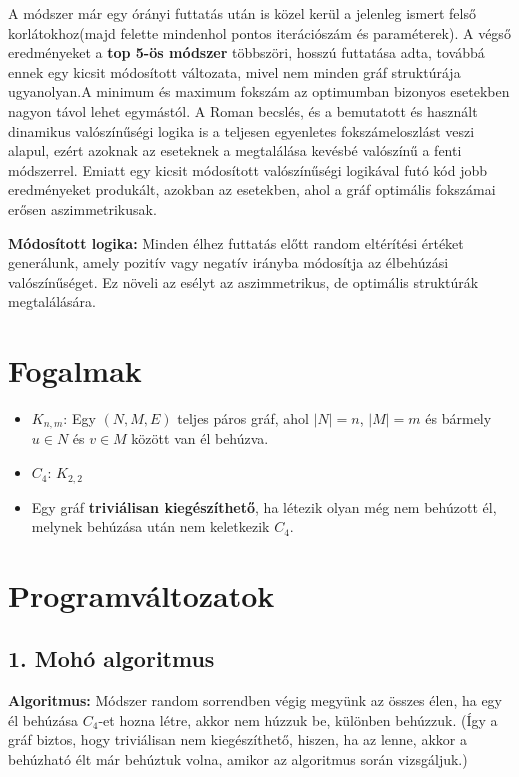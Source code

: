 \documentclass[12pt,a4paper]{article}
\begin{document}
A módszer már egy órányi futtatás után is közel kerül a jelenleg ismert felső korlátokhoz(majd felette mindenhol pontos iterációszám és paraméterek). A végső eredményeket a \textbf{top 5-ös módszer} többszöri, hosszú futtatása adta, továbbá ennek egy kicsit módosított változata, mivel nem minden gráf struktúrája ugyanolyan.A minimum és maximum fokszám az optimumban bizonyos esetekben nagyon távol lehet egymástól. A Roman becslés, és a bemutatott és használt dinamikus valószínűségi logika is a teljesen egyenletes fokszámeloszlást veszi alapul, ezért azoknak az eseteknek a megtalálása kevésbé valószínű a fenti módszerrel.
Emiatt egy kicsit módosított valószínűségi logikával futó kód jobb eredményeket produkált, azokban az esetekben, ahol a gráf optimális fokszámai erősen aszimmetrikusak.

\textbf{Módosított logika:} Minden élhez futtatás előtt random eltérítési értéket generálunk, amely pozitív vagy negatív irányba módosítja az élbehúzási valószínűséget. Ez növeli az esélyt az aszimmetrikus, de optimális struktúrák megtalálására.

\section*{Fogalmak}

\begin{itemize}
    \item $K_{n,m}$: Egy $(N,M,E)$ teljes páros gráf, ahol $|N|=n$, $|M|=m$ és bármely $u \in N$ és $v \in M$ között van él behúzva.
    \item $C_4$: $K_{2,2}$
    \item Egy gráf \textbf{triviálisan kiegészíthető}, ha létezik olyan még nem behúzott él, melynek behúzása után nem keletkezik $C_4$.
\end{itemize}

\section*{Programváltozatok}

\subsection*{1. Mohó algoritmus}
\textbf{Algoritmus:} Módszer random sorrendben végig megyünk az összes élen, ha egy él behúzása $C_4$-et hozna létre, akkor nem húzzuk be, különben behúzzuk. (Így a gráf biztos, hogy triviálisan nem kiegészíthető, hiszen, ha az lenne, akkor a behúzható élt már behúztuk volna, amikor az algoritmus során vizsgáljuk.)
\end{document}
